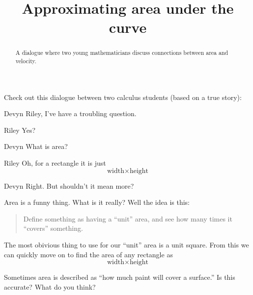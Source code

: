 \documentclass{ximera}
\title[Break-Ground:]{Approximating area under the curve}
\begin{document}
\begin{abstract}
A dialogue where two young mathematicians discuss connections between
area and velocity.
\end{abstract}
\maketitle




Check out this dialogue between two calculus students (based on a true
story):

\begin{dialogue}
\item[Devyn] Riley, I've have a troubling question.
\item[Riley] Yes? 
\item[Devyn] What is area?
\item[Riley] Oh, for a rectangle it is just
  \[
  \text{width}\times \text{height}
  \]
\item[Devyn] Right. But shouldn't it mean more?
\end{dialogue}

Area is a funny thing. What is it really? Well the idea is this:
\begin{quote}
Define something as having a ``unit'' area, and see how many times it
``covers'' something.
\end{quote}
The most obivious thing to use for our ``unit'' area is a unit
square. From this we can quickly move on to find the area of any
rectangle as
  \[
  \text{width}\times \text{height}
  \]
\begin{problem}
  Sometimes area is described as ``how much paint will cover a surface.''
  Is this accurate? What do you think?
  \begin{freeResponse}
  \end{freeResponse}
\end{problem}

\end{document}
